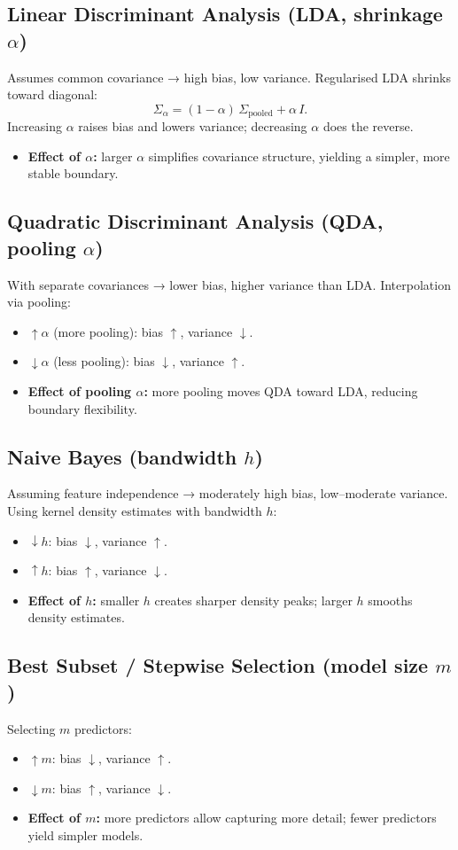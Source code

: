 \documentclass{article}
\begin{document}
\subsection{Linear Discriminant Analysis (LDA, shrinkage \(\alpha\))}
Assumes common covariance → high bias, low variance.  Regularised LDA shrinks toward diagonal:
\[
\Sigma_\alpha = (1-\alpha)\,\Sigma_{\mathrm{pooled}} + \alpha\,I.
\]
Increasing \(\alpha\) raises bias and lowers variance; decreasing \(\alpha\) does the reverse.
\begin{itemize}
  \item \textbf{Effect of \(\alpha\):} larger \(\alpha\) simplifies covariance structure, yielding a simpler, more stable boundary.
\end{itemize}

\subsection{Quadratic Discriminant Analysis (QDA, pooling \(\alpha\))}
With separate covariances → lower bias, higher variance than LDA.  Interpolation via pooling:
\begin{itemize}
  \item \(\uparrow\alpha\) (more pooling): bias \(\uparrow\), variance \(\downarrow\).
  \item \(\downarrow\alpha\) (less pooling): bias \(\downarrow\), variance \(\uparrow\).
  \item \textbf{Effect of pooling \(\alpha\):} more pooling moves QDA toward LDA, reducing boundary flexibility.
\end{itemize}

\subsection{Naive Bayes (bandwidth \(h\))}
Assuming feature independence → moderately high bias, low–moderate variance.  Using kernel density estimates with bandwidth \(h\):
\begin{itemize}
  \item \(\downarrow h\): bias \(\downarrow\), variance \(\uparrow\).
  \item \(\uparrow h\): bias \(\uparrow\), variance \(\downarrow\).
  \item \textbf{Effect of \(h\):} smaller \(h\) creates sharper density peaks; larger \(h\) smooths density estimates.
\end{itemize}

\subsection{Best Subset / Stepwise Selection (model size \(m\))}
Selecting \(m\) predictors:
\begin{itemize}
  \item \(\uparrow m\): bias \(\downarrow\), variance \(\uparrow\).
  \item \(\downarrow m\): bias \(\uparrow\), variance \(\downarrow\).
  \item \textbf{Effect of \(m\):} more predictors allow capturing more detail; fewer predictors yield simpler models.
\end{itemize}
\end{document}
